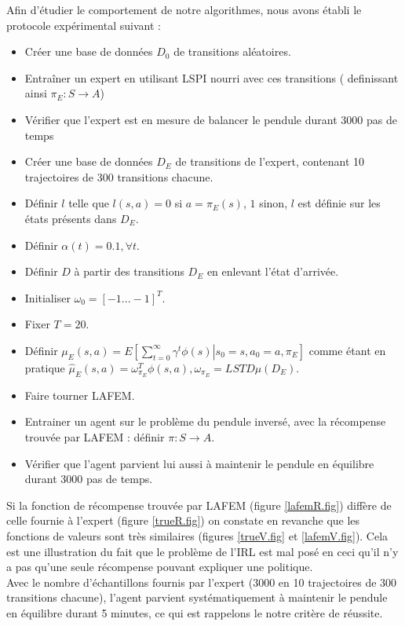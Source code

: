 \documentclass[publibook-draft]{CAp2012}
\begin{document}
Afin d'étudier le comportement de notre algorithmes, nous avons établi le protocole expérimental suivant :
\begin{itemize}
 \item Créer une base de données $D_0$ de transitions aléatoires.
 \item Entraîner un expert en utilisant LSPI nourri avec ces transitions ( definissant ainsi $\pi_E : S\rightarrow A$)
 \item Vérifier que l'expert est en mesure de balancer le pendule durant 3000 pas de temps
 \item Créer une base de données $D_E$ de transitions de l'expert, contenant 10 trajectoires de 300 transitions chacune.
 \item Définir $l$ telle que $l(s,a) = 0$ si $a=\pi_E(s)$, $1$ sinon, $l$ est définie sur les états présents dans $D_E$.
 \item Définir $\alpha(t) = 0.1,\forall t$.
 \item Définir $D$ à partir des transitions $D_E$ en enlevant l'état d'arrivée.
 \item Initialiser $\omega_0 = [-1...-1]^T$.
 \item Fixer $T=20$.
 \item Définir $\mu_E(s,a) = E\left.\left[\sum\limits_{t=0}^\infty \gamma^t \phi(s)\right|s_0 = s, a_0 = a, \pi_E\right]$ comme étant en pratique $\hat\mu_E(s,a) =  \omega^T_{\pi_E}\phi(s,a), \omega_{\pi_E} = LSTD\mu(D_E)$.
 \item Faire tourner LAFEM.
 \item Entrainer un agent sur le problème du pendule inversé, avec la récompense trouvée par LAFEM : définir $\pi : S\rightarrow A$.
 \item Vérifier que l'agent parvient lui aussi à maintenir le pendule en équilibre durant 3000 pas de temps.
\end{itemize}

Si la fonction de récompense trouvée par LAFEM (figure \ref{lafemR.fig}) diffère de celle fournie à l'expert (figure \ref{trueR.fig}) on constate en revanche que les fonctions de valeurs sont très similaires (figures \ref{trueV.fig} et \ref{lafemV.fig}). Cela est une illustration du fait que le problème de l'IRL est mal posé en ceci qu'il n'y a pas qu'une seule récompense pouvant expliquer une politique.\\

Avec le nombre d'échantillons fournis par l'expert (3000 en 10 trajectoires de 300 transitions chacune), l'agent parvient systématiquement à maintenir le pendule en équilibre durant 5 minutes, ce qui est rappelons le notre critère de réussite.\\
\end{document}
